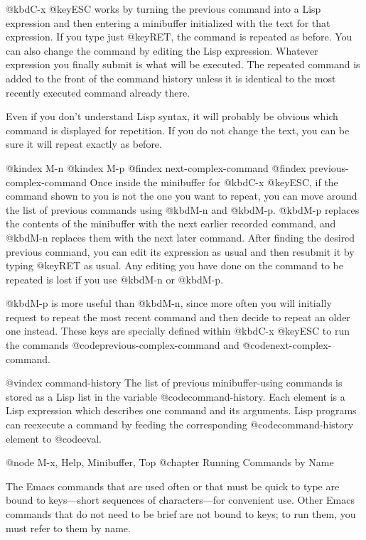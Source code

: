 {{{{{{  @kbd{C-x @key{ESC}} works by turning the previous command into a Lisp
expression and then entering a minibuffer initialized with the text for
that expression.  If you type just @key{RET}, the command is repeated as
before.  You can also change the command by editing the Lisp expression.
Whatever expression you finally submit is what will be executed.  The
repeated command is added to the front of the command history unless it is
identical to the most recently executed command already there.

  Even if you don't understand Lisp syntax, it will probably be obvious
which command is displayed for repetition.  If you do not change the text,
you can be sure it will repeat exactly as before.

@kindex M-n
@kindex M-p
@findex next-complex-command
@findex previous-complex-command
  Once inside the minibuffer for @kbd{C-x @key{ESC}}, if the command shown
to you is not the one you want to repeat, you can move around the list of
previous commands using @kbd{M-n} and @kbd{M-p}.  @kbd{M-p} replaces the
contents of the minibuffer with the next earlier recorded command, and
@kbd{M-n} replaces them with the next later command.  After finding the
desired previous command, you can edit its expression as usual and then
resubmit it by typing @key{RET} as usual.  Any editing you have done on the
command to be repeated is lost if you use @kbd{M-n} or @kbd{M-p}.

  @kbd{M-p} is more useful than @kbd{M-n}, since more often you will
initially request to repeat the most recent command and then decide to
repeat an older one instead.  These keys are specially defined within
@kbd{C-x @key{ESC}} to run the commands @code{previous-complex-command} and
@code{next-complex-command}.

@vindex command-history
  The list of previous minibuffer-using commands is stored as a Lisp list
in the variable @code{command-history}.  Each element is a Lisp expression
which describes one command and its arguments.  Lisp programs can reexecute
a command by feeding the corresponding @code{command-history} element to
@code{eval}.

@node M-x, Help, Minibuffer, Top
@chapter Running Commands by Name

  The Emacs commands that are used often or that must be quick to type are
bound to keys---short sequences of characters---for convenient use.  Other
Emacs commands that do not need to be brief are not bound to keys; to run
them, you must refer to them by name.

}}}}}}
